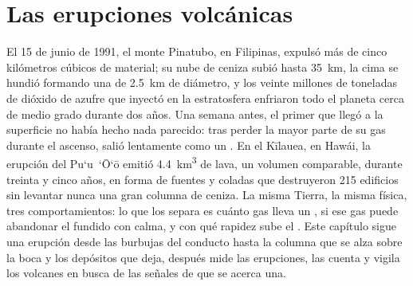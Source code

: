 \chapter{Las erupciones volcánicas}\label{ch:b2:eruptive-styles}

El 15 de junio de 1991, el monte Pinatubo, en Filipinas, expulsó más de cinco
kilómetros cúbicos de material; su nube de ceniza subió hasta
\qty{35}{km}, la cima se hundió formando una  de \qty{2.5}{km} de diámetro, y los
veinte millones de toneladas de dióxido de azufre que inyectó en la estratosfera enfriaron
todo el planeta cerca de medio grado durante dos años. Una semana antes, el primer
 que llegó a la superficie no había hecho nada parecido: tras perder la mayor parte de su
gas durante el ascenso, salió lentamente como un . En el Kīlauea, en Hawái, la
erupción del Pu`u~`\=O`\=o emitió \qty{4.4}{km^3} de lava, un volumen comparable,
durante treinta y cinco años, en forma de fuentes y coladas que destruyeron 215 edificios
sin levantar nunca una gran columna de ceniza. La misma Tierra, la misma física, tres comportamientos: lo que
los separa es cuánto gas lleva un , si ese gas puede abandonar el
fundido con calma, y con qué rapidez sube el . Este capítulo sigue una erupción
desde las burbujas del conducto hasta la columna que se alza sobre la boca y los depósitos que
deja, después mide las erupciones, las cuenta y vigila los volcanes en busca de las
señales de que se acerca una.

